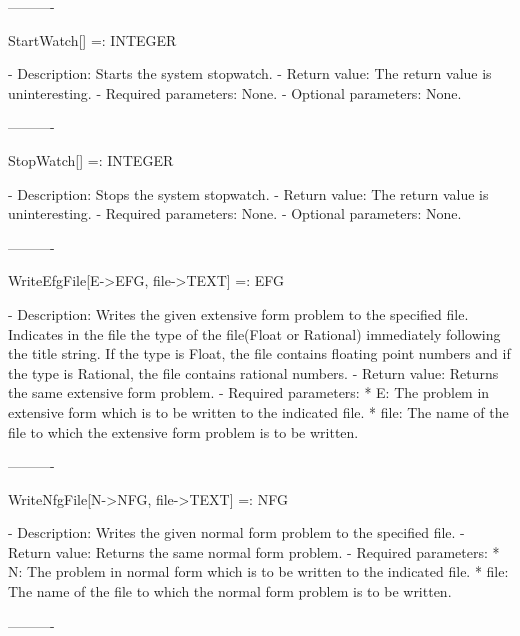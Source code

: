 ----------

StartWatch[] =: INTEGER

   -	Description:  Starts the system stopwatch.  
   -	Return value:  The return value is uninteresting.
   -	Required parameters:  None.
   -	Optional parameters:  None.

----------

StopWatch[] =: INTEGER

   -	Description:  Stops the system stopwatch.  
   -	Return value:  The return value is uninteresting.
   -	Required parameters:  None.
   -	Optional parameters:  None.

----------

WriteEfgFile[E->EFG, file->TEXT] =: EFG

   -	Description:  Writes the given extensive form problem to the specified 
	file.  Indicates in the file the type of the file(Float or Rational) 
	immediately following the title string.  If the type is Float, the file
	contains floating point numbers and if the type is Rational, the file
	contains rational numbers.  
   -	Return value:  Returns the same extensive form problem.
   -	Required parameters:
	  *  E:  The problem in extensive form which is to be written to the
		indicated file.
	  *  file:  The name of the file to which the extensive form problem is
		to be written.

----------

WriteNfgFile[N->NFG, file->TEXT] =: NFG

   -	Description:  Writes the given normal form problem to the specified 
	file.  
   -	Return value:  Returns the same normal form problem.
   -	Required parameters:
	  *  N:  The problem in normal form which is to be written to the
		indicated file.
	  *  file:  The name of the file to which the normal form problem is
		to be written.

----------





























